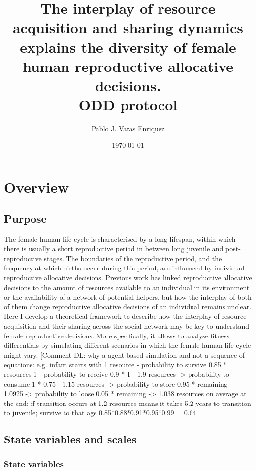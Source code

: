\documentclass{article}
\title{The interplay of resource acquisition and sharing dynamics explains the diversity of female human reproductive allocative decisions.
\\
ODD protocol}
\author{Pablo J. Varas Enriquez}
\date{\today}
\begin{document}
\maketitle

\tableofcontents

\section{Overview}

\subsection{Purpose}

The female human life cycle is characterised by a long lifespan, within which there is usually a short reproductive period in between long juvenile and post-reproductive stages. The boundaries of the reproductive period, and the frequency at which births occur during this period, are influenced by individual reproductive allocative decisions. Previous work has linked reproductive allocative decisions to the amount of resources available to an individual in its environment or the availability of a network of potential helpers, but how the interplay of both of them change reproductive allocative decisions of an individual remains unclear. Here I develop a theoretical framework to describe how the interplay of resource acquisition and their sharing across the social network may be key to understand female reproductive decisions. More specifically, it allows to analyse fitness differentials by simulating different scenarios in which the female human life cycle might vary. [Comment DL: why a agent-based simulation and not a sequence of equations: e.g. infant starts with 1 resource - probability to survive 0.85 * resources 1 - probability to receive 0.9 * 1 - 1.9 resources -> probability to consume 1 * 0.75 - 1.15 resources -> probability to store 0.95 * remaining - 1.0925 -> probability to loose 0.05 * remaining -> 1.038 resources on average at the end; if transition occurs at 1.2 resources means it takes 5.2 years to transition to juvenile; survive to that age 0.85*0.88*0.91*0.95*0.99 = 0.64]

\subsection{State variables and scales}

\subsubsection{State variables}
\end{document}
